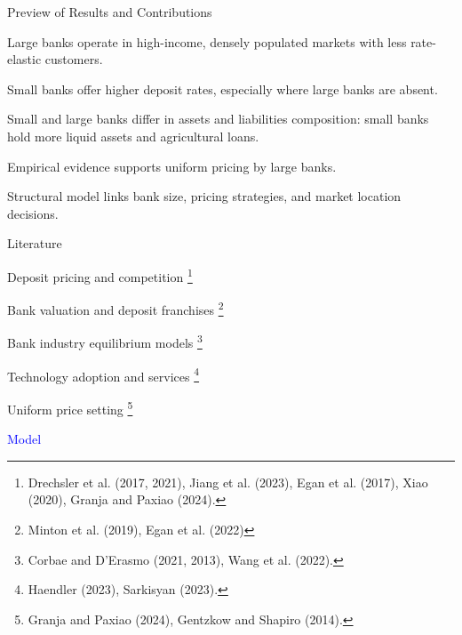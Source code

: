 \documentclass[notes,10pt, aspectratio=169]{beamer}
\newenvironment{wideitemize}{\itemize\addtolength{\itemsep}{10pt}}{\enditemize}
\begin{document}
\begin{frame}{Preview of Results and Contributions}
    \begin{wideitemize}
        \item Large banks operate in high-income, densely populated markets with less rate-elastic customers.
        \item Small banks offer higher deposit rates, especially where large banks are absent.
        \item Small and large banks differ in assets and liabilities composition: small banks hold more liquid assets and agricultural loans.
        \item Empirical evidence supports uniform pricing by large banks.
        \item Structural model links bank size, pricing strategies, and market location decisions.
    \end{wideitemize}
    \end{frame}
    
    \begin{frame}{Literature}
    \begin{wideitemize}
        \item Deposit pricing and competition \footnote{ Drechsler et al. (2017, 2021), Jiang et al. (2023), Egan et al. (2017), Xiao (2020),
 Granja and Paxiao (2024).}
        \item Bank valuation and deposit franchises \footnote{Minton et al. (2019), Egan et al. (2022)}
        \item Bank industry equilibrium models \footnote{Corbae and D'Erasmo (2021, 2013), Wang et al. (2022).}
        \item Technology adoption and services \footnote{Haendler (2023), Sarkisyan (2023).}
        \item Uniform price setting \footnote{Granja and Paxiao (2024), Gentzkow and Shapiro (2014).}

    \end{wideitemize}
\end{frame}
    
    


\begin{frame}[noframenumbering]

\huge \centering \textcolor{blue}{Model}

\end{frame}
\end{document}
